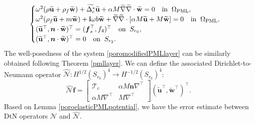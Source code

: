 \documentclass[11pt]{article}
\newcommand{\Om}{\Omega}
\newcommand{\De}{\Delta}
\newcommand{\wid}{\widetilde}
\newcommand{\bs}{\boldsymbol}
\newcommand{\PML}{{\rm PML}}
\begin{document}
\begin{equation}\label{poromodifiedPMLlayer}
\begin{cases}
\omega^2(\rho\wid{\mathbf{u}} +\rho_f \wid{\mathbf{w}})+\wid{\De_c^*}\wid{\mathbf{u}} 
+\alpha M\wid{\nabla} \wid{\nabla}\cdot  \wid{\mathbf{w}}=0\quad {\rm in}\;\;\Om_{\PML},\\
\omega^2(\rho_f \wid{\mathbf{u}}+m \wid{\mathbf{w}})+{\bf{i}}\omega b \wid{\mathbf{w}}+
\wid{\nabla} \wid{\nabla} \cdot [\alpha M \wid{\mathbf{u}}+ M \wid{\mathbf{w}}]
=0 \quad {\rm in}\;\;\Om_{\PML},\\
(\wid{\mathbf{u}}^{\top},	\bs{n}\cdot\wid{\mathbf{w}})^{\top}
=(\bs{f}_s ^{\top},f_4)^{\top}\quad {\rm on} \;\;S_{r_0},\\
(\wid{\mathbf{u}}^{\top},	\bs{n}\cdot\wid{\mathbf{w}})^{\top}
=0\quad {\rm on} \;\;S_{r_2}.
\end{cases}
\end{equation} 
The well-posedness of the system \eqref{poromodifiedPMLlayer} can be similarly obtained 
following Theorem \ref{pmllayer}.
We can define the associated Dirichlet-to-Neumann operator 
$\hat{\mathcal{N}}:H^{1/2}(S_{r_0})^4\to H^{-1/2}(S_{r_0})^4$:
$$ \hat{\mathcal{N}}\bs{f}=\begin{bmatrix}
\mathcal{T}_c & \alpha M \bs{n} \nabla^{\top} \\
\alpha M \nabla^{\top} &  M \nabla^{\top}
\end{bmatrix} (\wid{\mathbf{u}}^{\top},\wid{\mathbf{w}}^{\top})^{\top}. $$
Based on Lemma \ref{poroelasticPMLpotential}, we have the error estimate between DtN operators
$\mathcal{N}$ and $\hat{\mathcal{N}}$.
\end{document}

